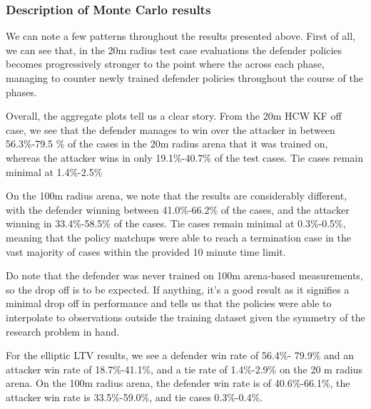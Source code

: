 \clearpage




\subsubsection{Description of Monte Carlo results}



We can note a few patterns throughout the results presented above. First of all, we can see that, in the 20m radius test case evaluations the defender policies becomes progressively stronger to the point where the across each phase, managing to counter newly trained defender policies throughout the course of the phases. 

Overall, the aggregate plots tell us a clear story. From the 20m HCW KF off case, we see that the defender manages to win over the attacker in between 56.3\%-79.5 \% of the cases in the 20m radius arena that it was trained on, whereas the attacker wins in only 19.1\%-40.7\% of the test cases. Tie cases remain minimal at 1.4\%-2.5\%

On the 100m radius arena, we note that the results are considerably different, with the defender winning between 41.0\%-66.2\% of the cases, and the attacker winning in 33.4\%-58.5\% of the cases. Tie cases remain minimal at 0.3\%-0.5\%, meaning that the policy matchups were able to reach a termination case in the vast majority of cases within the provided 10 minute time limit.


Do note that the defender was never trained on 100m arena-based measurements, so the drop off is to be expected. If anything, it's a good result as it signifies a minimal drop off in performance and tells us that the policies were able to interpolate to observations outside the training dataset given the symmetry of the research problem in hand.

For the elliptic LTV results, we see a defender win rate of 56.4\%- 79.9\% and an attacker win rate of 18.7\%-41.1\%, and a tie rate of 1.4\%-2.9\% on the 20 m radius arena. On the 100m radius arena, the defender win rate is of 40.6\%-66.1\%, the attacker win rate is 33.5\%-59.0\%, and tie cases 0.3\%-0.4\%.


